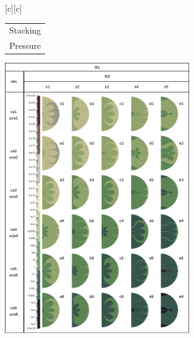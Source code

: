[c][c] {\footnotesize \begin{tabular}{@{}c@{}} Stacking \\ Pressure \end{tabular}}



\includegraphics[width=0.6\textwidth]{contour_figs_Griffith_xx_Ta_pressure_crevice_298K.eps}